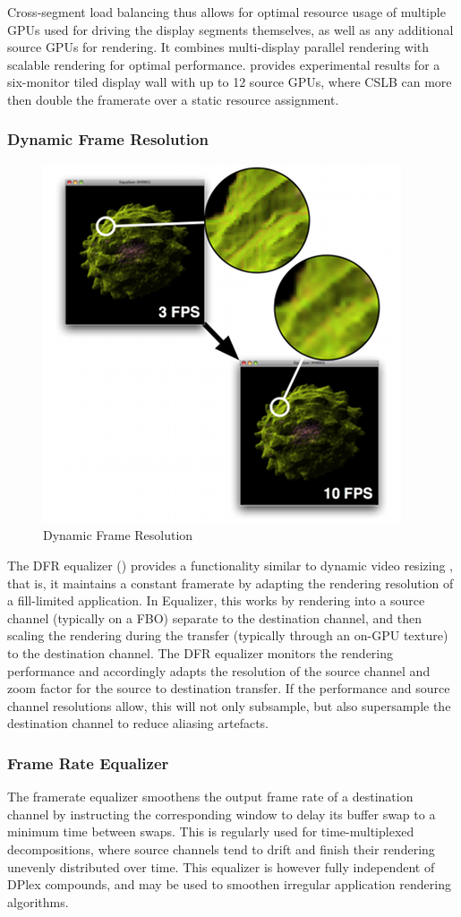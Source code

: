 Cross-segment load balancing thus allows for optimal resource usage of multiple
GPUs used for driving the display segments themselves, as well as any additional
source GPUs for rendering. It combines multi-display parallel rendering with
scalable rendering for optimal performance. \cite{EEP:11} provides experimental
results for a six-monitor tiled display wall with up to 12 source GPUs, where
CSLB can more then double the framerate over a static resource assignment.

\subsubsection{Dynamic Frame Resolution}

\begin{figure}
  \includegraphics[width=.382\textwidth]{images/dfr}
  \caption{\label{fdfr}Dynamic Frame Resolution}
\end{figure}
The DFR equalizer () provides a functionality similar to dynamic
video resizing \cite{MBDM:97}, that is, it maintains a constant framerate by
adapting the rendering resolution of a fill-limited application. In
\textsf{Equalizer}, this works by rendering into a source channel (typically on
a FBO) separate to the destination channel, and then scaling the rendering
during the transfer (typically through an on-GPU texture) to the destination
channel. The DFR equalizer monitors the rendering performance and accordingly
adapts the resolution of the source channel and zoom factor for the source to
destination transfer. If the performance and source channel resolutions allow,
this will not only subsample, but also supersample the destination channel to
reduce aliasing artefacts.

\subsubsection{Frame Rate Equalizer}\label{sec:framerateEq}

The framerate equalizer smoothens the output frame rate of a destination channel
by instructing the corresponding window to delay its buffer swap to a minimum
time between swaps. This is regularly used for time-multiplexed decompositions,
where source channels tend to drift and finish their rendering unevenly
distributed over time. This equalizer is however fully independent of DPlex
compounds, and may be used to smoothen irregular application rendering
algorithms.

